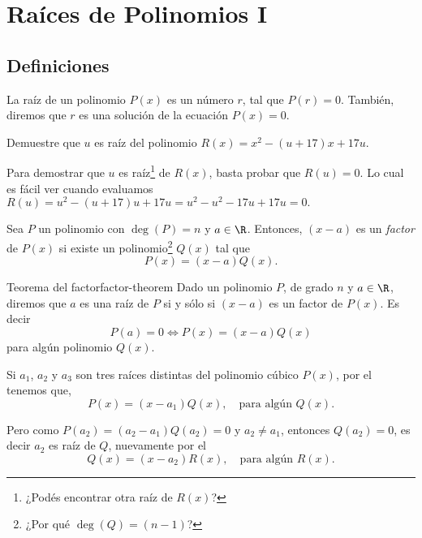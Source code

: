 \newpage
\section{Raíces de Polinomios I}

\subsection{Definiciones}

\begin{section-definition.tcb}
    La raíz de un polinomio $P(x)$ es un número $r$, tal que $P(r) = 0$.
    También, diremos que $r$ es una solución de la ecuación $P(x) = 0$.
\end{section-definition.tcb}

\begin{section-example.tcb}
    Demuestre que $u$ es raíz del polinomio $R(x) = x^2 - (u + 17) x + 17u$.
\end{section-example.tcb}
\begin{solution}
    Para demostrar que $u$ es raíz\footnote{¿Podés encontrar otra raíz de $R(x)$?} de $R(x)$, basta probar que $R(u) = 0$.
    Lo cual es fácil ver cuando evaluamos $R(u) = u^2 - (u+17)u + 17u = u^2 - u^2 - 17u + 17u = 0.$
\end{solution}

\begin{section-definition.tcb}
    Sea $P$ un polinomio con $\deg{(P)} = n$ y $a \in \R$.
    Entonces, $(x - a)$ es un \emph{factor} de $P(x)$ si existe un polinomio\footnote{¿Por qué $\deg{(Q)} = (n - 1)$?} $Q(x)$ tal que
    \[
        P(x) = (x-a)Q(x).
    \]
\end{section-definition.tcb}

\begin{section-theorem.tcb}{Teorema del factor}{factor-theorem}
    Dado un polinomio $P$, de grado $n$ y $a \in \R$, diremos que $a$ es una raíz de $P$ si y sólo si $(x-a)$ es un factor de $P(x)$.
    Es decir
    \[
        P(a) = 0 \Leftrightarrow P(x) = (x - a)Q(x)
    \]
    para algún polinomio $Q(x).$
\end{section-theorem.tcb}

Si $a_1$, $a_2$ y $a_3$ son tres raíces distintas del polinomio cúbico $P(x)$, por el  tenemos que,
\[
    P(x) = (x - a_1)Q(x),\quad \text{para algún $Q(x)$}.
\]

Pero como $P(a_2) = (a_2 - a_1)Q(a_2) = 0$ y $a_2 \neq a_1$, entonces $Q(a_2) = 0$, es decir $a_2$ es raíz de $Q$, nuevamente por el 
\[
    Q(x) = (x - a_2)R(x),\quad \text{para algún $R(x)$}.
\]

